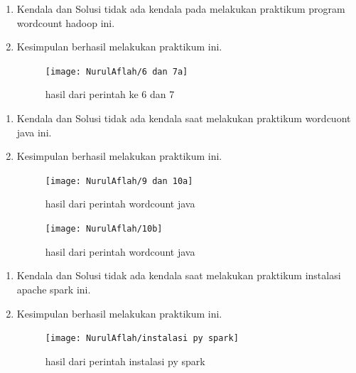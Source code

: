 \begin{enumerate}
\item Kendala dan Solusi
\newline tidak ada kendala pada melakukan praktikum program wordcount hadoop ini.

\item Kesimpulan
\newline berhasil melakukan praktikum ini.

\begin{figure} [!ht]
\texttt{[image: NurulAflah/6 dan 7a]}
\caption{hasil dari perintah ke 6 dan 7}
\label{gam:6 dan 7a}
\end{figure}
\end{enumerate}


\begin{enumerate}
\item Kendala dan Solusi
\newline tidak ada kendala saat melakukan praktikum wordcuont java ini.

\item Kesimpulan
\newline berhasil melakukan praktikum ini.
\newpage
\begin{figure} [!ht]
\texttt{[image: NurulAflah/9 dan 10a]}
\caption{hasil dari perintah wordcount java}
\label{gam:9 dan 10a}
\end{figure}

\begin{figure} [!ht]
\texttt{[image: NurulAflah/10b]}
\caption{hasil dari perintah wordcount java}
\label{gam:10b}
\end{figure}
\end{enumerate}

\begin{enumerate}
\item Kendala dan Solusi
\newline tidak ada kendala saat melakukan praktikum instalasi apache spark ini.

\item Kesimpulan
\newline berhasil melakukan praktikum ini.

\begin{figure} [!ht]
\texttt{[image: NurulAflah/instalasi py spark]}
\caption{hasil dari perintah instalasi py spark}
\label{gam:instalasi py spark}
\end{figure}
\end{enumerate}


